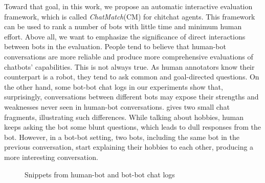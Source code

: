 Toward that goal, in this work, we propose an automatic interactive evaluation 
framework, which is called \textit{ChatMatch}(CM) for chitchat
agents. This framework can be used to rank a number of bots with little
time and minimum human effort.  Above all, we want to emphasize 
the significance of direct interactions between bots 
in the evaluation.
People tend to believe that human-bot conversations are more reliable 
and produce more comprehensive evaluations of chatbots' capabilities. 
This is not always true. As human annotators know their counterpart is a robot, 
they tend to ask common and goal-directed questions. 
On the other hand, some bot-bot chat logs in our experiments show that, 
surprisingly, conversations between different bots may expose their strengths 
and weaknesses never seen in human-bot conversations. 
 gives two small chat fragments, illustrating such
differences.
While talking about hobbies, human keeps asking the bot some blunt
questions, which leads to dull responses from the bot.
However, in a bot-bot setting, two bots, including the same bot in the previous
conversation, start explaining their hobbies to each other, producing a more
interesting conversation. 

\begin{figure}[ht!]
 \centering

 
 \caption{Snippets from human-bot and bot-bot chat logs}
\label{fig:two convs}
\end{figure}

